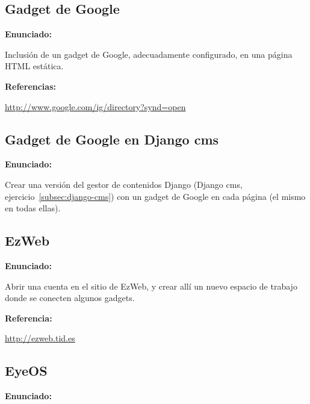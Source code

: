 \subsection{Gadget de Google}
\label{subsec:gadget-google}

\textbf{Enunciado:}

Inclusión de un gadget de Google, adecuadamente configurado, en una página HTML estática.

\textbf{Referencias:}

\url{http://www.google.com/ig/directory?synd=open}

\subsection{Gadget de Google en Django cms}
\label{subsec:gadget-google-cms}

\textbf{Enunciado:}

Crear una versión del gestor de contenidos Django (Django cms, ejercicio~\ref{subsec:django-cms}) con un gadget de Google en cada página (el mismo en todas ellas).

\subsection{EzWeb}
\label{subsec:ezweb}

\textbf{Enunciado:}

Abrir una cuenta en el sitio de EzWeb, y crear allí un nuevo espacio de trabajo donde se conecten algunos gadgets.

\textbf{Referencia:}

\url{http://ezweb.tid.es}

\subsection{EyeOS}
\label{subsec:eyeos}

\textbf{Enunciado:}

